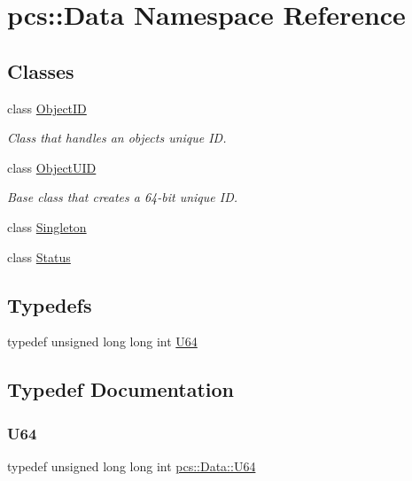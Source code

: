\hypertarget{namespacepcs_1_1Data}{}\section{pcs\+:\+:Data Namespace Reference}
\label{namespacepcs_1_1Data}
\subsection*{Classes}
\begin{DoxyCompactItemize}
\item 
class \hyperlink{classpcs_1_1Data_1_1ObjectID}{Object\+ID}
\begin{DoxyCompactList}\small\item\em Class that handles an object\textquotesingle{}s unique ID. \end{DoxyCompactList}\item 
class \hyperlink{classpcs_1_1Data_1_1ObjectUID}{Object\+U\+ID}
\begin{DoxyCompactList}\small\item\em Base class that creates a 64-\/bit unique ID. \end{DoxyCompactList}\item 
class \hyperlink{classpcs_1_1Data_1_1Singleton}{Singleton}
\item 
class \hyperlink{classpcs_1_1Data_1_1Status}{Status}
\end{DoxyCompactItemize}
\subsection*{Typedefs}
\begin{DoxyCompactItemize}
\item 
typedef unsigned long long int \hyperlink{namespacepcs_1_1Data_a9aad6b21cf2fcd3515ecc3bbd069eb34}{U64}
\end{DoxyCompactItemize}


\subsection{Typedef Documentation}
\mbox{\label{namespacepcs_1_1Data_a9aad6b21cf2fcd3515ecc3bbd069eb34}} 
\subsubsection{\texorpdfstring{U64}{U64}}
{\footnotesize\ttfamily typedef unsigned long long int \hyperlink{namespacepcs_1_1Data_a9aad6b21cf2fcd3515ecc3bbd069eb34}{pcs\+::\+Data\+::\+U64}}

